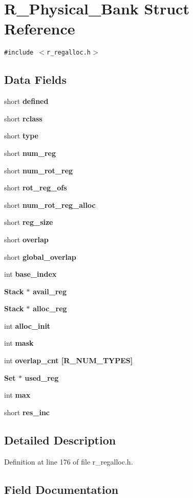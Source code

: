 \section{R\_\-Physical\_\-Bank Struct Reference}
\label{structR__Physical__Bank}
{\tt \#include $<$r\_\-regalloc.h$>$}

\subsection*{Data Fields}
\begin{CompactItemize}
\item 
short \bf{defined}
\item 
short \bf{rclass}
\item 
short \bf{type}
\item 
short \bf{num\_\-reg}
\item 
short \bf{num\_\-rot\_\-reg}
\item 
short \bf{rot\_\-reg\_\-ofs}
\item 
short \bf{num\_\-rot\_\-reg\_\-alloc}
\item 
short \bf{reg\_\-size}
\item 
short \bf{overlap}
\item 
short \bf{global\_\-overlap}
\item 
int \bf{base\_\-index}
\item 
\bf{Stack} $\ast$ \bf{avail\_\-reg}
\item 
\bf{Stack} $\ast$ \bf{alloc\_\-reg}
\item 
int \bf{alloc\_\-init}
\item 
int \bf{mask}
\item 
int \bf{overlap\_\-cnt} [R\_\-NUM\_\-TYPES]
\item 
\bf{Set} $\ast$ \bf{used\_\-reg}
\item 
int \bf{max}
\item 
short \bf{res\_\-inc}
\end{CompactItemize}


\subsection{Detailed Description}




Definition at line 176 of file r\_\-regalloc.h.

\subsection{Field Documentation}
